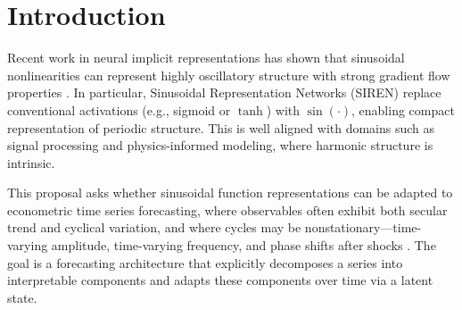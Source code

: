 \section{Introduction}
Recent work in neural implicit representations has shown that sinusoidal nonlinearities can represent highly oscillatory structure with strong gradient flow properties \citep{sitzmann2020}. In particular, Sinusoidal Representation Networks (SIREN) replace conventional activations (e.g., sigmoid or $\tanh$) with $\sin(\cdot)$, enabling compact representation of periodic structure. This is well aligned with domains such as signal processing and physics-informed modeling, where harmonic structure is intrinsic.

This proposal asks whether sinusoidal function representations can be adapted to econometric time series forecasting, where observables often exhibit both secular trend and cyclical variation, and where cycles may be nonstationary---time-varying amplitude, time-varying frequency, and phase shifts after shocks \citep{huang1998,lubik2015}. The goal is a forecasting architecture that explicitly decomposes a series into interpretable components and adapts these components over time via a latent state.
